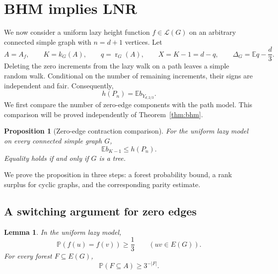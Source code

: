 \documentclass[11pt,reqno]{amsart}
\newtheorem{proposition}[theorem]{Proposition}
\newtheorem{lemma}[theorem]{Lemma}
\theoremstyle{remark}
\numberwithin{equation}{section}
\newcommand{\E}{\mathbb E}
\newcommand{\PP}{\mathbb P}
\newcommand{\LL}{\mathcal L}
\DeclareMathOperator{\rk}{r}
\begin{document}
\section{BHM implies LNR}\label{sec:lnr}

We now consider a uniform lazy height function $f\in\LL(G)$ on an
arbitrary connected simple graph with $n=d+1$ vertices. Let
\begin{equation}\label{eq:lazy-notation}
 A=A_f,\qquad K=k_G(A),\qquad q=\rk_G(A),\qquad
 X=K-1=d-q,\qquad \Delta_G=\E q-\frac d3.
\end{equation}
Deleting the zero increments from the lazy walk on a path leaves a
simple random walk. Conditional on the number of remaining increments,
their signs are independent and fair. Consequently,
\begin{equation}\label{eq:lazy-path}
 h(P_n)=\E b_{Y_{d,2/3}}.
\end{equation}
We first compare the number of zero-edge components with the path
model. This comparison will be proved independently of
Theorem~\ref{thm:bhm}.

\begin{proposition}[Zero-edge contraction comparison]\label{prop:lazy-contraction}
For the uniform lazy model on every connected simple graph $G$,
\begin{equation}\label{eq:lazy-contraction}
 \E b_{K-1}\le h(P_n).
\end{equation}
Equality holds if and only if $G$ is a tree.
\end{proposition}

We prove the proposition in three steps: a forest probability bound,
a rank surplus for cyclic graphs, and the corresponding parity estimate.

\subsection{A switching argument for zero edges}

\begin{lemma}\label{lem:lazy-forest}
In the uniform lazy model,
\begin{equation}\label{eq:lazy-edge}
 \PP(f(u)=f(v))\ge\frac13\qquad(uv\in E(G)).
\end{equation}
For every forest $F\subseteq E(G)$,
\begin{equation}\label{eq:lazy-forest}
 \PP(F\subseteq A)\ge3^{-|F|}.
\end{equation}
\end{lemma}
\end{document}

